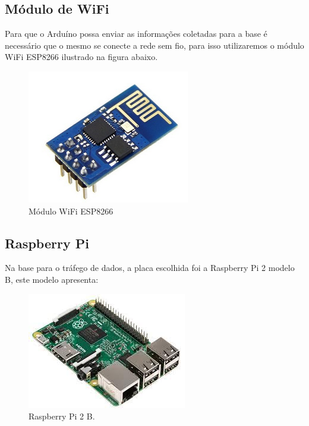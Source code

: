   \subsection{Módulo de WiFi}
  \label{sub:Modulo_de_wifi}
    Para que o Arduíno possa enviar as informações coletadas para a base é necessário que o mesmo se conecte a rede sem fio, para isso utilizaremos o módulo WiFi ESP8266 ilustrado na figura abaixo.

  \begin{figure}[H]                                      
    \centering                                           
    \includegraphics[scale=0.8]{figuras/modulo_wifi.png}
    \caption{Módulo WiFi ESP8266}                              
    \label{img:modulo_wifi}                             
  \end{figure}                                           

  \subsection{Raspberry Pi}
  \label{sub:Raspberry}
    Na base para o tráfego de dados, a placa escolhida foi a Raspberry Pi 2 modelo B, este modelo apresenta:

  \begin{figure}[H]                                      
    \centering                                           
    \includegraphics[scale=0.8]{figuras/rasp.jpg} 
    \caption{Raspberry Pi 2 B.}                        
    \label{img:Rasp}                              
  \end{figure}                                           

